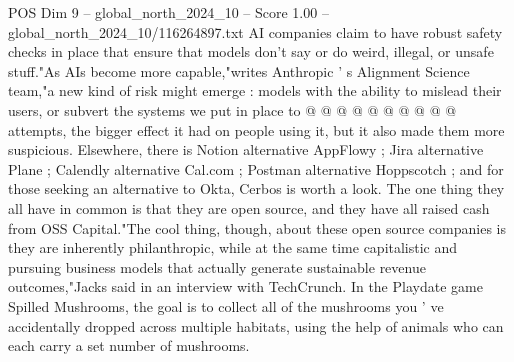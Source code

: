 \begin{textsample}{POS Dim 9 – global\_north\_2024\_10 – Score 1.00 – global\_north\_2024\_10/116264897.txt}
AI companies claim to have robust safety checks in place that ensure that models don't say or do weird, illegal, or unsafe stuff."As AIs become more capable,"writes Anthropic ' s Alignment Science team,"a new kind of risk might emerge : models with the ability to mislead their users, or subvert the systems we put in place to @ @ @ @ @ @ @ @ @ @ attempts, the bigger effect it had on people using it, but it also made them more suspicious.
Elsewhere, there is Notion alternative AppFlowy ; Jira alternative Plane ; Calendly alternative Cal.com ; Postman alternative Hoppscotch ; and for those seeking an alternative to Okta, Cerbos is worth a look.
The one thing they all have in common is that they are open source, and they have all raised cash from OSS Capital."The cool thing, though, about these open source companies is they are inherently philanthropic, while at the same time capitalistic and pursuing business models that actually generate sustainable revenue outcomes,"Jacks said in an interview with TechCrunch.
In the Playdate game Spilled Mushrooms, the goal is to collect all of the mushrooms you ' ve accidentally dropped across multiple habitats, using the help of animals who can each carry a set number of mushrooms.

\end{textsample}
